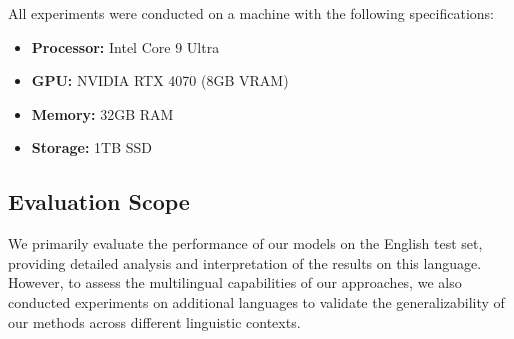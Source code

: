 All experiments were conducted on a machine with the following specifications:
\begin{itemize}
\item \textbf{Processor:} Intel Core 9 Ultra
\item \textbf{GPU:} NVIDIA RTX 4070 (8GB VRAM)
\item \textbf{Memory:} 32GB RAM
\item \textbf{Storage:} 1TB SSD
\end{itemize}

\subsection{Evaluation Scope}

We primarily evaluate the performance of our models on the English test set, providing detailed analysis and interpretation of the results on this language. However, to assess the multilingual capabilities of our approaches, we also conducted experiments on additional languages to validate the generalizability of our methods across different linguistic contexts.